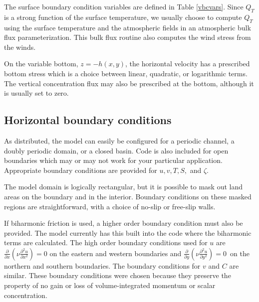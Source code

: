 The surface boundary condition variables are defined in Table
\ref{vbcvars}.  Since $Q_T$ is a strong function of the surface
temperature, we usually choose to compute $Q_T$ using the surface
temperature and the atmospheric fields in an atmospheric bulk flux
parameterization. This bulk flux routine also computes the wind
stress from the winds.

On the variable bottom,
$z = -h(x,y)$, the horizontal velocity has
a prescribed bottom stress which is a choice between linear,
quadratic, or logarithmic terms.
The vertical concentration flux may also be prescribed at the bottom,
although it is usually set to zero.

\subsection{Horizontal boundary conditions}
As distributed, the model can easily be configured for a periodic
channel, a doubly periodic domain, or a closed basin.  Code is also
included for open boundaries which may or may not work for your
particular application. Appropriate boundary conditions are
provided for $u,v,T,S,$ and $\zeta$.

The model domain is logically rectangular, but it is possible to
mask out land areas on the boundary and in the interior. Boundary
conditions on these masked regions are straightforward,
with a choice of no-slip or free-slip walls.

If biharmonic friction is used, a higher order boundary condition
must also be provided.  The model currently has this built into the
code where the biharmonic terms are calculated.  The high order
boundary conditions used for $u$ are $\frac{\partial}{\partial x} \left(
{\nu} \frac{\partial ^2 u}{\partial x^2} \right) = 0$ on the
eastern and western boundaries and $\frac{\partial}{\partial y} \left(
{\nu} \frac{\partial ^2 u}{\partial y^2} \right) = 0\,$ on the
northern and southern boundaries.  The boundary conditions for $v$
and $C$ are similar.  These boundary conditions were chosen because
they preserve the property of no gain or loss of volume-integrated
momentum or scalar concentration.

